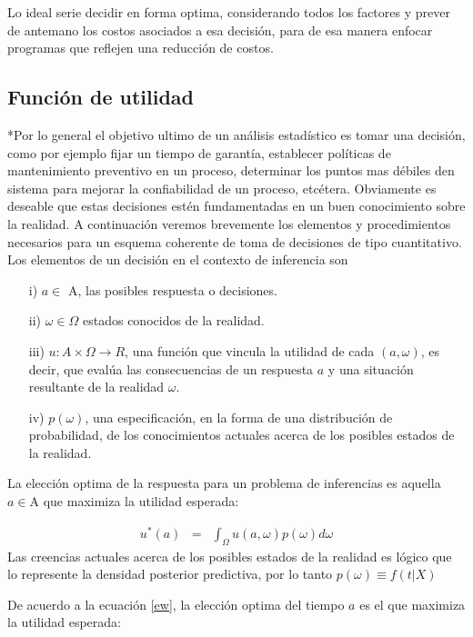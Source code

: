 \documentclass[letterpaper, titlepage,openright, twoside,11pt]{book}
\begin{document}
Lo ideal serie decidir en forma optima, considerando todos los factores y prever de antemano los costos asociados a esa decisi\'on, para de esa manera enfocar programas que reflejen una reducci\'on de costos.


\subsection{Funci\'on de utilidad}

*Por lo general el objetivo ultimo de un an\'alisis estad\'istico es tomar una decisi\'on, como por ejemplo fijar un tiempo de garant\'ia, establecer pol\'iticas de mantenimiento preventivo en un proceso, determinar los puntos mas d\'ebiles den sistema para mejorar la confiabilidad de un proceso, etc\'etera. Obviamente es deseable que estas decisiones est\'en fundamentadas en un buen conocimiento sobre la realidad. A continuaci\'on veremos brevemente los elementos  y procedimientos necesarios para un esquema coherente de toma de decisiones de tipo cuantitativo. Los elementos de un decisi\'on en el contexto de inferencia son


\begin{itemize}
\item[i)] $a\in$ A, las posibles respuesta o decisiones.
\item[ii)]$\omega\in \Omega$ estados conocidos de la realidad.
\item[iii)]$u: A\times\Omega\rightarrow R$, una funci\'on que vincula la utilidad de cada $(a,\omega)$, es decir, que eval\'ua las consecuencias de un respuesta $a$ y una situaci\'on resultante de la realidad $\omega$.
\item[iv)] $p(\omega)$, una especificaci\'on, en la forma de una distribuci\'on de probabilidad, de los conocimientos actuales acerca de los posibles estados de la realidad.
\end{itemize}

La elecci\'on optima de la respuesta para un problema de inferencias  es aquella $a\in$A que maximiza la utilidad esperada:

\begin{eqnarray}\label{ew}
u^{*}(a)&=&\int_{\Omega} u(a,\omega)p(\omega)d\omega
\end{eqnarray}
Las creencias actuales acerca de los posibles estados de la realidad es l\'ogico que lo represente la densidad posterior predictiva, por lo tanto $p(\omega)\equiv f(t|X)$

De acuerdo a la ecuaci\'on \ref{ew}, la elecci\'on optima del tiempo $a$ es el que maximiza la utilidad esperada:
\end{document}
